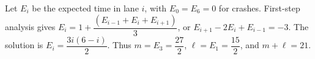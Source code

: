 Let $E_i$ be the expected time in lane $i$, with $E_0=E_6=0$ for crashes. First-step analysis gives $E_i=1+\dfrac{(E_{i-1}+E_i+E_{i+1})}{3}$, or $E_{i+1}-2E_i+E_{i-1}=-3$. The solution is $E_i=\dfrac{3i(6-i)}{2}$. Thus $m=E_3=\dfrac{27}{2}$, $\ell=E_1=\dfrac{15}{2}$, and $m+\ell=\boxed{21}$.
